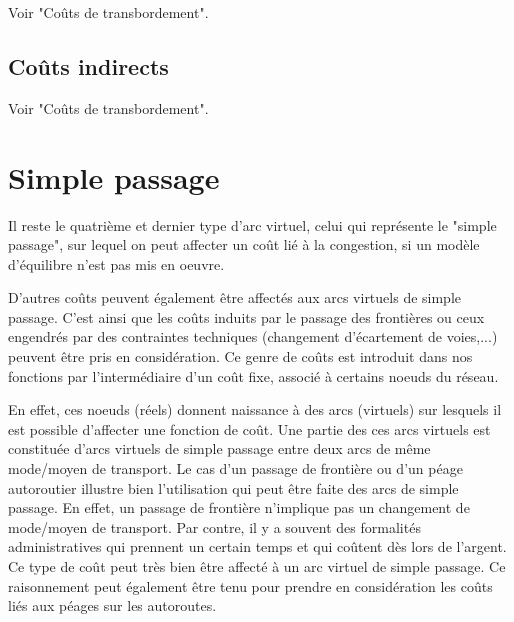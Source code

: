 Voir "Coûts de transbordement".

\subsection{Co\^uts indirects}

Voir "Coûts de transbordement".

\section{Simple passage}

Il reste le quatrième et dernier type d'arc virtuel, celui qui
représente le "simple passage", sur lequel on peut affecter un coût
lié à la congestion, si un modèle d'équilibre n'est pas mis en
oeuvre.

D'autres coûts peuvent également être affectés aux arcs virtuels de simple
passage. C'est ainsi que les coûts induits par le passage des frontières ou ceux
engendrés par des contraintes techniques (changement d'écartement de voies,...)
peuvent être pris en considération. Ce genre de coûts est introduit dans nos
fonctions par l'intermédiaire d'un coût fixe, associé à certains noeuds du
réseau.

En effet, ces noeuds (réels) donnent naissance à des arcs
(virtuels) sur lesquels il est possible d'affecter une fonction de
coût. Une partie des ces arcs virtuels est constituée d'arcs
virtuels de simple passage entre deux arcs de même mode/moyen de
transport.  Le cas d'un passage de frontière ou d'un péage
autoroutier illustre bien l'utilisation qui peut être faite des
arcs de simple passage. En effet, un passage de frontière
n'implique pas un changement de mode/moyen de transport. Par
contre, il y a souvent des formalités administratives qui prennent
un certain temps et qui coûtent dès lors de l'argent. Ce type de
coût peut très bien être affecté à un arc virtuel de simple
passage. Ce raisonnement peut également être tenu pour prendre en
considération les coûts liés aux péages sur les autoroutes.
